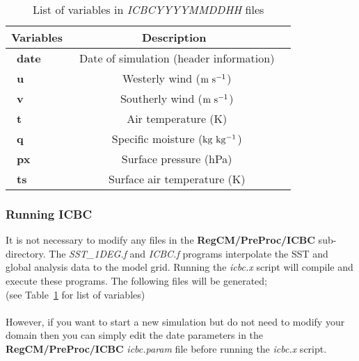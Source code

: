 \begin{table}[!]
\begin{center}
\caption{List of variables in {\it ICBCYYYYMMDDHH} files}  \label{icbc_vars}
\vspace{0.25cm}
\begin{tabular}{|l|c|l|} \hline \hline
{\small {\bf Variables}} & {\small {\bf Description}} \\ \hline \hline
{\ {\bf date}}    & {\ {Date of simulation (header information) } }      \\ \hline
{\ {\bf u}}    & {\ {Westerly wind (${\rm m~s^{-1}}$) } }      \\ \hline
{\ {\bf v}}    & {\ {Southerly wind (${\rm m~s^{-1}}$)} }     \\ \hline
{\ {\bf t}}    & {\ {Air temperature (K)}}       \\ \hline
{\ {\bf q}}    & {\ {Specific moisture (${\rm kg~kg^{-1}}$)} }      \\ \hline
{\ {\bf px}}    & {\ {Surface pressure (hPa)} }     \\ \hline
{\ {\bf ts}}    & {\ {Surface air temperature (K)}}       \\ \hline
\end{tabular}
\end{center}
\end{table}

\subsubsection{Running ICBC}
\noindent It is not necessary to modify any files in the  {\bf RegCM/PreProc/ICBC} 
sub-directory. The {\it SST\_1DEG.f} and {\it ICBC.f} programs interpolate 
the SST and global analysis data to the model grid.  Running the 
{\it icbc.x} script will compile and execute these programs.  The following 
files will be generated; \\ 

 (see Table~\ref{icbc_vars} for list of variables) \\
  \\

\noindent However, if you want to start a new simulation but do not need to modify your
domain then you can simply edit the date parameters in the {\bf RegCM/PreProc/ICBC}
{\it icbc.param} file before running the {\it icbc.x} script.


